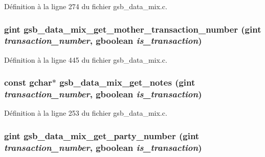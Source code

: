 Définition à la ligne 274 du fichier gsb\_\-data\_\-mix.c.

\subsubsection[{gsb\_\-data\_\-mix\_\-get\_\-mother\_\-transaction\_\-number}]{\setlength{\rightskip}{0pt plus 5cm}gint gsb\_\-data\_\-mix\_\-get\_\-mother\_\-transaction\_\-number (gint {\em transaction\_\-number}, \/  gboolean {\em is\_\-transaction})}\label{gsb__data__mix_8h_a92077f6b914030fd23025b5083687ee7}


Définition à la ligne 445 du fichier gsb\_\-data\_\-mix.c.

\subsubsection[{gsb\_\-data\_\-mix\_\-get\_\-notes}]{\setlength{\rightskip}{0pt plus 5cm}const gchar$\ast$ gsb\_\-data\_\-mix\_\-get\_\-notes (gint {\em transaction\_\-number}, \/  gboolean {\em is\_\-transaction})}\label{gsb__data__mix_8h_a675cd78efcd3c110c33a70d32a19200d}


Définition à la ligne 253 du fichier gsb\_\-data\_\-mix.c.

\subsubsection[{gsb\_\-data\_\-mix\_\-get\_\-party\_\-number}]{\setlength{\rightskip}{0pt plus 5cm}gint gsb\_\-data\_\-mix\_\-get\_\-party\_\-number (gint {\em transaction\_\-number}, \/  gboolean {\em is\_\-transaction})}\label{gsb__data__mix_8h_a15f48a192807e7e7aa53eb3238974c6f}


